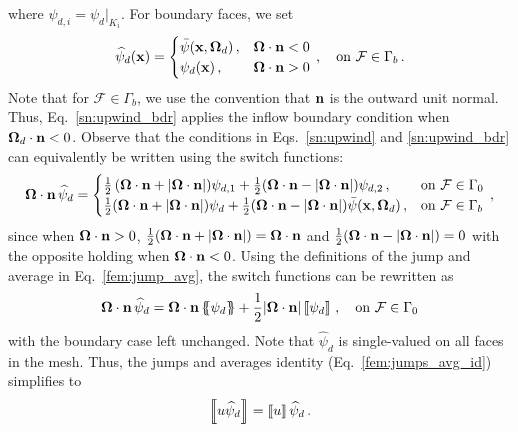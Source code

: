 \documentclass[../doc.tex]{subfiles}
\begin{document}
where $\psi_{d,i} = \psi_d|_{K_i}$. For boundary faces, we set 
	\begin{equation} \label{sn:upwind_bdr}
		\widehat{\psi}_d(\boldsymbol{\mathrm{x}}) = \begin{cases}
			\bar{\psi}(\boldsymbol{\mathrm{x}},\boldsymbol{\Omega}_d) \,, & \boldsymbol{\Omega}\cdot\boldsymbol{\mathrm{n}} < 0 \\
			\psi_d(\boldsymbol{\mathrm{x}}) \,, & \boldsymbol{\Omega}\cdot\boldsymbol{\mathrm{n}} > 0 
		\end{cases} \,, \quad \text{on}\ \mathcal{F} \in \Gamma_b \,. 
	\end{equation}
Note that for $\mathcal{F} \in \Gamma_b$, we use the convention that $\boldsymbol{\mathrm{n}}$ is the outward unit normal. Thus, Eq.~\ref{sn:upwind_bdr} applies the inflow boundary condition when $\boldsymbol{\Omega}_d\cdot\boldsymbol{\mathrm{n}}<0$. Observe that the conditions in Eqs.~\ref{sn:upwind} and \ref{sn:upwind_bdr} can equivalently be written using the switch functions: 
	\begin{equation}
		\Omegahat\cdot\n\,\widehat{\psi}_d = \begin{cases}
			\frac{1}{2}\paren{\Omegahat\cdot\n + |\Omegahat\cdot\n|}\!\psi_{d,1} + \frac{1}{2}(\Omegahat\cdot\n - |\Omegahat\cdot\n|)\psi_{d,2} \,, & \text{on}\ \mathcal{F} \in \Gamma_0 \\ 
			\frac{1}{2}(\Omegahat\cdot\n + |\Omegahat\cdot\n|)\psi_{d} + \frac{1}{2}(\Omegahat\cdot\n - |\Omegahat\cdot\n|)\bar{\psi}(\x,\Omegahat_d) \,, & \text{on}\ \mathcal{F} \in \Gamma_b 
		\end{cases} \,, 
	\end{equation}
since when $\boldsymbol{\Omega}\cdot\boldsymbol{\mathrm{n}}>0$, $\frac{1}{2}(\boldsymbol{\Omega}\cdot\boldsymbol{\mathrm{n}} + |\boldsymbol{\Omega}\cdot\boldsymbol{\mathrm{n}}|) = \boldsymbol{\Omega}\cdot\boldsymbol{\mathrm{n}}$ and $\frac{1}{2}(\boldsymbol{\Omega}\cdot\boldsymbol{\mathrm{n}} - |\boldsymbol{\Omega}\cdot\boldsymbol{\mathrm{n}}|) = 0$ with the opposite holding when $\boldsymbol{\Omega}\cdot\boldsymbol{\mathrm{n}}<0$. Using the definitions of the jump and average in Eq.~\ref{fem:jump_avg}, the switch functions can be rewritten as 
	\begin{equation}
		\Omegahat\cdot\n\,\widehat{\psi}_d = 
			\Omegahat\cdot\n\avg{\psi_d} + \frac{1}{2}|\Omegahat\cdot\n|\jump{\psi_d} \,, \quad \text{on}\ \mathcal{F} \in \Gamma_0 
	\end{equation}
with the boundary case left unchanged. Note that $\widehat{\psi}_d$ is single-valued on all faces in the mesh. Thus, the jumps and averages identity (Eq.~\ref{fem:jumps_avg_id}) simplifies to 
	\begin{equation}
		\left\llbracket u\widehat{\psi}_d \right\rrbracket = \left\llbracket u \right\rrbracket \widehat{\psi}_d \,. 
	\end{equation}
\end{document}
